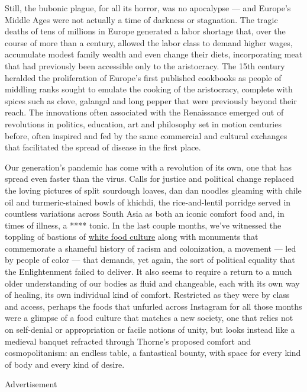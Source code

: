 Still, the bubonic plague, for all its horror, was no apocalypse --- and
Europe's Middle Ages were not actually a time of darkness or stagnation.
The tragic deaths of tens of millions in Europe generated a labor
shortage that, over the course of more than a century, allowed the labor
class to demand higher wages, accumulate modest family wealth and even
change their diets, incorporating meat that had previously been
accessible only to the aristocracy. The 15th century heralded the
proliferation of Europe's first published cookbooks as people of
middling ranks sought to emulate the cooking of the aristocracy,
complete with spices such as clove, galangal and long pepper that were
previously beyond their reach. The innovations often associated with the
Renaissance emerged out of revolutions in politics, education, art and
philosophy set in motion centuries before, often inspired and fed by the
same commercial and cultural exchanges that facilitated the spread of
disease in the first place.

Our generation's pandemic has come with a revolution of its own, one
that has spread even faster than the virus. Calls for justice and
political change replaced the loving pictures of split sourdough loaves,
dan dan noodles gleaming with chile oil and turmeric-stained bowls of
khichdi, the rice-and-lentil porridge served in countless variations
across South Asia as both an iconic comfort food and, in times of
illness, a **** tonic. In the last couple months, we've witnessed the
toppling of bastions of
\href{https://www.nytimes3xbfgragh.onion/2020/06/29/dining/john-t-edge-southern-foodways-alliance.html}{white
food culture} along with monuments that commemorate a shameful history
of racism and colonization, a movement --- led by people of color ---
that demands, yet again, the sort of political equality that the
Enlightenment failed to deliver. It also seems to require a return to a
much older understanding of our bodies as fluid and changeable, each
with its own way of healing, its own individual kind of comfort.
Restricted as they were by class and access, perhaps the foods that
unfurled across Instagram for all those months were a glimpse of a food
culture that matches a new society, one that relies not on self-denial
or appropriation or facile notions of unity, but looks instead like a
medieval banquet refracted through Thorne's proposed comfort and
cosmopolitanism: an endless table, a fantastical bounty, with space for
every kind of body and every kind of desire.

Advertisement

